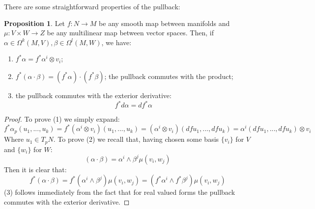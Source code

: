\documentclass[12pt,a4paper]{report}
\theoremstyle{definition}
\theoremstyle{Theorem}
\newtheorem{Prop}[Def]{Proposition}
\theoremstyle{definition}
\theoremstyle{definition}
\begin{document}
	There are some straightforward properties of the pullback:
	\begin{Prop}\label{Prop_3.4.3}
		Let $f:N\rightarrow M$ be any smooth map between manifolds and $\mu:V\times W\rightarrow Z$ be any multilinear map between vector spaces. Then, if $\alpha\in\Omega^k(M,V),\beta\in\Omega^l(M,W)$, we have:
		\begin{enumerate}
			\item $f^*\alpha=f^*\alpha^i\otimes v_i$;
			\item $f^*(\alpha\cdot \beta)=(f^*\alpha)\cdot (f^*\beta)$; the pullback commutes with the product;
			\item the pullback commutes with the exterior derivative:
			$$f^*d\alpha=df^*\alpha$$
		\end{enumerate}
	\end{Prop}
	\begin{proof}
		To prove (1) we simply expand:
		$$f^*\alpha_p(u_1,...,u_k)=f^*(\alpha^i\otimes v_i)(u_1,...,u_k)=(\alpha^i\otimes v_i)(dfu_1,...,dfu_k)=\alpha^i(dfu_1,...,dfu_k)\otimes v_i$$
		Where $u_1\in T_pN$. To prove (2) we recall that, having chosen some basis $\{v_i\}$ for $V$ and $\{w_i\}$ for $W$:
		$$(\alpha\cdot\beta)=\alpha^i\wedge\beta^j\mu(v_i,w_j)$$
		Then it is clear that:
		$$f^*(\alpha\cdot\beta)=f^*(\alpha^i\wedge\beta^j)\mu(v_i,w_j)=(f^*\alpha^i\wedge f^*\beta^j)\mu(v_i,w_j)$$
		(3) follows immediately from the fact that for real valued forms the pullback commutes with the exterior derivative.
	\end{proof}
\end{document}
